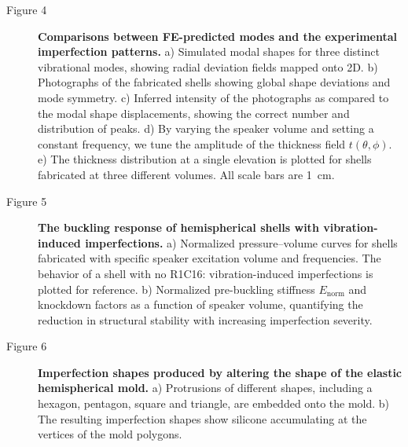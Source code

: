 \documentclass[twocolumn,letter,11pt]{article}
\begin{document}
\begin{description}
\item[Figure 4] \textbf{Comparisons between FE-predicted modes and the experimental imperfection patterns.}
a) Simulated modal shapes for three distinct vibrational modes, showing radial deviation fields mapped onto 2D. b) Photographs of the fabricated shells showing global shape deviations and mode symmetry. c) Inferred intensity of the photographs as compared to the modal shape displacements, showing the correct number and distribution of peaks. d) By varying the speaker volume and setting a constant frequency, we tune the amplitude of the thickness field $t(\theta,\phi)$. e) The thickness distribution at a single elevation is plotted for shells fabricated at three different volumes. All scale bars are \SI{1}{\centi\metre}.
\item[Figure 5] \textbf{The buckling response of hemispherical shells with vibration-induced imperfections.} a) Normalized pressure--volume curves for shells fabricated with specific speaker excitation volume and frequencies. The behavior of a shell with no R1C16: vibration-induced imperfections is plotted for reference.
b) Normalized pre-buckling stiffness $E_{\mathrm{norm}}$ and knockdown factors as a function of speaker volume, quantifying the reduction in structural stability with increasing imperfection severity.
\item[Figure 6]\textbf{Imperfection shapes produced by altering the shape of the elastic hemispherical mold.} a) Protrusions of different shapes, including a hexagon, pentagon, square and triangle, are embedded onto the mold. b) The resulting imperfection shapes show silicone accumulating at the vertices of the mold polygons.
\end{description}
\end{document}
